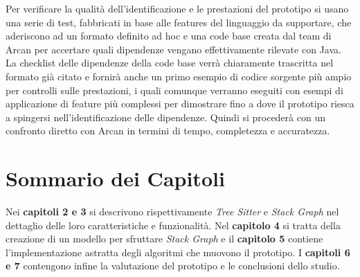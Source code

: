 
Per verificare la qualit\`a dell'identificazione e le prestazioni del prototipo si usano una serie di test, fabbricati in base alle features del linguaggio da supportare, che aderiscono ad un formato definito ad hoc e una code base creata dal team di Arcan per accertare quali dipendenze vengano effettivamente rilevate con Java. La checklist delle dipendenze della code base verr\`a chiaramente trascritta nel formato gi\`a citato e fornir\`a anche un primo esempio di codice sorgente pi\`u ampio per controlli sulle prestazioni, i quali comunque verranno eseguiti con esempi di applicazione di feature pi\`u complessi per dimostrare fino a dove il prototipo riesca a spingersi nell'identificazione delle dipendenze. Quindi si proceder\`a con un confronto diretto con Arcan in termini di tempo, completezza e accuratezza.

\section{Sommario dei Capitoli}

Nei \textbf{capitoli 2 e 3} si descrivono rispettivamente \emph{Tree Sitter} e \emph{Stack Graph} nel dettaglio delle loro caratteristiche e funzionalit\`a. Nel \textbf{capitolo 4} si tratta della creazione di un modello per sfruttare \emph{Stack Graph} e il \textbf{capitolo 5} contiene l'implementazione astratta degli algoritmi che muovono il prototipo. I \textbf{capitoli 6 e 7} contengono infine la valutazione del prototipo e le conclusioni dello studio.
